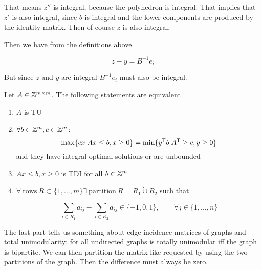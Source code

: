 \begin{pr}
That means $z''$ is integral, because the polyhedron is integral. That implies that $z'$ is also integral, since $b$ is integral and the lower components are produced by the identity matrix. Then of course $z$ is also integral.

Then we have from the definitions above

\[z-y=B^{-1}e_i\]

But since $z$ and $y$ are integral $B^{-1}e_i$ must also be integral.

\end{pr}

\begin{thm} Let $A\in \mathbb{Z}^{m\times m}$. The following statements are equivalent
\begin{enumerate}
\item $A$ is TU
\item $\forall b \in \mathbb{Z}^m, c\in \mathbb{Z}^m$:
\[\max \{cx|Ax\leq b, x\geq 0\} = \min \{{y}^\text{\upshape \sffamily T} b|{A}^\text{\upshape \sffamily T} \geq c, y\geq 0\}\]
and they have integral optimal solutions or are unbounded
\item $Ax\leq b, x\geq 0$ is TDI for all $b\in \mathbb{Z}^m$
\item $\forall\ \text{rows}\ R\subset \{1,\ldots, m\} \exists\ \text{partition}\ R = R_1 \dot \cup R_2$ such that

\[\sum_{i\in R_1} a_{ij} - \sum_{i\in R_2} a_{ij} \in \{-1,0,1\}, \qquad \forall j\in \{1,\ldots, n\}\]
\end{enumerate}
\end{thm}

The last part tells us something about edge incidence matrices of graphs and total unimodularity: for all undirected graphs is totally unimodular iff the graph is bipartite. We can then partition the matrix like requested by using the two partitions of the graph. Then the difference must always be zero.
